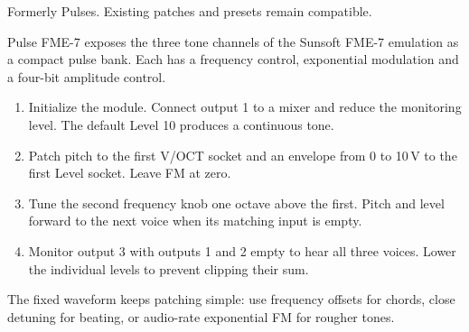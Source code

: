 Formerly Pulses. Existing patches and presets remain compatible.

Pulse FME-7 exposes the three tone channels of the Sunsoft FME-7 emulation as a
compact pulse bank. Each has a frequency control, exponential modulation
and a four-bit amplitude control.

\begin{enumerate}
\item Initialize the module. Connect output 1 to a mixer and reduce the
monitoring level. The default Level 10 produces a continuous tone.
\item Patch pitch to the first V/OCT socket and an envelope from 0 to 10\,V
to the first Level socket. Leave FM at zero.
\item Tune the second frequency knob one octave above the first. Pitch and
level forward to the next voice when its matching input is empty.
\item Monitor output 3 with outputs 1 and 2 empty to hear all three voices.
Lower the individual levels to prevent clipping their sum.
\end{enumerate}

The fixed waveform keeps patching simple: use frequency offsets for chords,
close detuning for beating, or audio-rate exponential FM for rougher tones.
